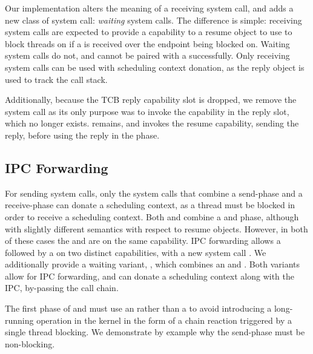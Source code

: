 Our implementation alters the meaning of a receiving system call, and adds a new class of system
call: \emph{waiting} system calls. The difference is simple: receiving system calls are expected to
provide a capability to a resume object to use to block threads on if a  is received over
the endpoint being blocked on. Waiting system calls do not, and cannot be paired with a 
successfully. Only receiving system calls can be used with scheduling context donation, as the reply
object is used to track the call stack.

Additionally, because the TCB reply capability slot is dropped, we remove the  system
call as its only purpose was to invoke the capability in the reply slot, which no longer exists.
 remains, and invokes the resume capability, sending the reply, before using the
reply in the  phase. 

\subsection{IPC Forwarding}

For sending system calls, only the system calls that combine a send-phase and a receive-phase can donate
a scheduling context, as a thread must be blocked in order to receive a scheduling context. Both
\call and \replyrecv combine a \send and \recv phase, although with slightly different semantics
with respect to resume objects. However, in both of these cases the \send and \recv are on the same
capability. IPC forwarding allows a \nbsend followed by a \recv on two distinct capabilities, with a
new system call \nbsendrecv. We additionally provide a waiting variant, \nbsendwait, which combines
an \nbsend and \wait. Both variants allow for IPC forwarding, and can donate a scheduling context
along with the IPC, by-passing the call chain. 

The first phase of \nbsendrecv and \nbsendwait must use an \nbsend rather than a \send
to avoid introducing a long-running operation in the kernel in the form of a chain reaction
triggered by a single thread blocking. We demonstrate by example why the send-phase must be
non-blocking.

